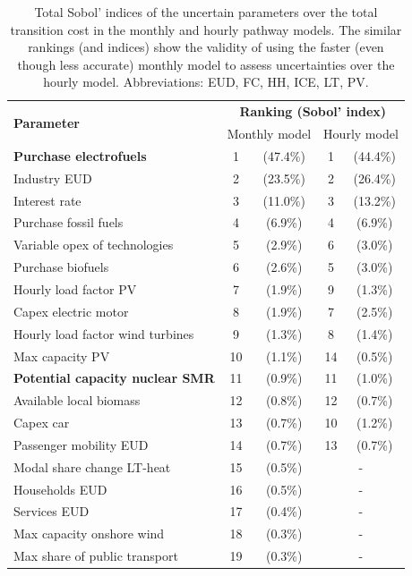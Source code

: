 \documentclass[11pt,twoside,a4paper,english]{article}
\begin{document}
\begin{appendices}
\begin{table}[htbp]
\caption{Total Sobol' indices of the uncertain parameters over the total transition cost in the monthly and hourly pathway models. The similar rankings (and indices) show the validity of using the faster (even though less accurate) monthly model to assess uncertainties over the hourly model. Abbreviations: \acrfull{EUD}, \acrfull{FC}, \acrfull{HH}, \acrfull{ICE}, \acrfull{LT}, \acrfull{PV}.}
\label{tab:UQ_full}
\centering
\begin{tabular}{l c c| c c}
\toprule
\multirow{2}{*}{\textbf{Parameter}}  & \multicolumn{4}{c}{\textbf{Ranking (Sobol' index)}}\\
 & \multicolumn{2}{c|}{Monthly model} 	& \multicolumn{2}{c}{Hourly model} \\ 	
\midrule
\textbf{Purchase electrofuels} & 1 & (47.4\%) & 1 & (44.4\%) \\
Industry EUD & 2 & (23.5\%) & 2 & (26.4\%)  \\
Interest rate & 3 & (11.0\%) &  3 & (13.2\%)  \\
Purchase fossil fuels  & 4 & (6.9\%) & 4 & (6.9\%)   \\
\midrule
Variable opex of technologies & 5 & (2.9\%) & 6 & (3.0\%) \\
Purchase biofuels & 6 & (2.6\%) & 5 & (3.0\%) \\
Hourly load factor PV & 7 & (1.9\%) & 9 & (1.3\%) \\
Capex electric motor & 8 & (1.9\%) & 7 & (2.5\%) \\
Hourly load factor wind turbines & 9 & (1.3\%) & 8 & (1.4\%) \\
Max capacity PV & 10 & (1.1\%) & 14 & (0.5\%) \\
\textbf{Potential capacity nuclear SMR} & 11 & (0.9\%) & 11 & (1.0\%) \\
Available local biomass & 12 & (0.8\%) & 12 & (0.7\%) \\
Capex car & 13 & (0.7\%) & 10 & (1.2\%) \\
Passenger mobility EUD & 14 & (0.7\%) & 13 & (0.7\%) \\
\midrule
Modal share change LT-heat & 15 & (0.5\%) & \multicolumn{2}{c}{-} \\
Households EUD & 16 & (0.5\%) & \multicolumn{2}{c}{-} \\
Services EUD & 17 & (0.4\%) & \multicolumn{2}{c}{-} \\
Max capacity onshore wind & 18 & (0.3\%) & \multicolumn{2}{c}{-} \\
Max share of public transport & 19 & (0.3\%) & \multicolumn{2}{c}{-} \\

\end{tabular}
\end{table}
\end{appendices}
\end{document}
